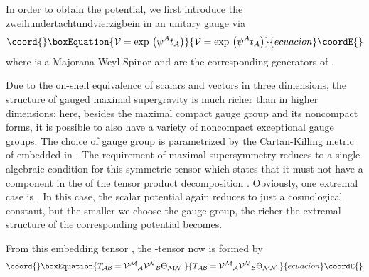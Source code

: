 \documentclass[a4paper,12pt]{article}
\begin{document}
In order to obtain the potential, we first introduce the
zwei\-hundert\-achtund\-vierzig\-bein \coordHE{} in an
unitary gauge via
\begin{equation}\coord{}\boxEquation{
\mathcal{V}=\exp\,\left(\psi^A t_A\right)
}{
\mathcal{V}=\exp\,\left(\psi^A t_A\right)
}{ecuacion}\coordE{}\end{equation}
where \coordHE{} is a \coordHE{} Majorana-Weyl-Spinor and
\coordHE{} are the corresponding generators of \coordHE{}.

Due to the on-shell equivalence of scalars and vectors in three
dimensions, the structure of gauged maximal \coordHE{} supergravity
is much richer than in higher dimensions; here, besides the maximal
compact gauge group \coordHE{} and its noncompact forms, it
is possible to also have a variety of noncompact exceptional gauge groups.
The choice of gauge group \coordHE{} is parametrized by the Cartan-Killing
metric of \coordHE{} embedded in \coordHE{}. The requirement of maximal
supersymmetry reduces to a single algebraic condition for this
symmetric tensor \myHighlight{$\Theta$}\coordHE{} which states that it must not have a
component in the \coordHE{} of the \coordHE{} tensor product
decomposition \coordHE{}.
Obviously, one extremal case is \coordHE{}. In this case, the scalar potential
again reduces to just a cosmological constant, but the smaller we
choose the gauge group, the richer the extremal structure of the
corresponding potential becomes.

From this embedding tensor \coordHE{}, the \coordHE{}-tensor now
is formed by
\begin{equation}\coord{}\boxEquation{
T_{\mathcal{AB}}={\mathcal{V}}{}^{\mathcal M}{}_{\mathcal A}{\mathcal{V}}{}^{\mathcal N}{}_{\mathcal B}\Theta_{\mathcal{MN}}.
}{
T_{\mathcal{AB}}={\mathcal{V}}{}^{\mathcal M}{}_{\mathcal A}{\mathcal{V}}{}^{\mathcal N}{}_{\mathcal B}\Theta_{\mathcal{MN}}.
}{ecuacion}\coordE{}\end{equation}
\end{document}
